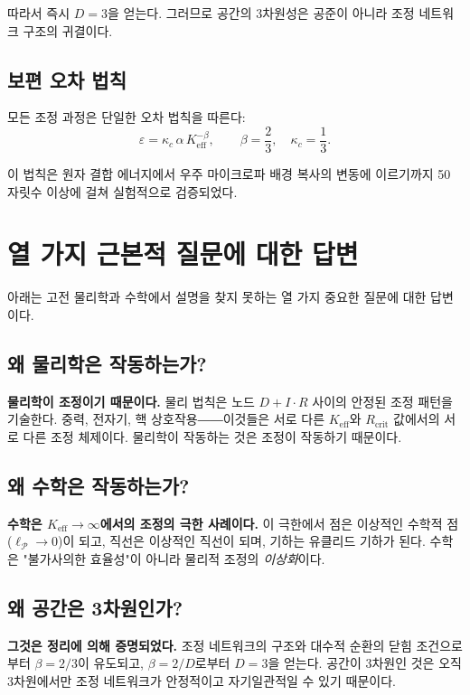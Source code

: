 \documentclass[12pt,a4paper]{article}
\newcommand{\Keff}{K_{\mathrm{eff}}}
\newcommand{\kappac}{\kappa_c}
\newcommand{\eps}{\varepsilon}
\newcommand{\betaf}{\beta}
\newcommand{\Rcrit}{R_{\mathrm{crit}}}
\newcommand{\calP}{\mathcal{P}}
\begin{document}
	따라서 즉시 \(D = 3\)을 얻는다. 그러므로 공간의 3차원성은 공준이 아니라 조정 네트워크 구조의 귀결이다.
	
	\subsection{보편 오차 법칙}
	
	모든 조정 과정은 단일한 오차 법칙을 따른다:
	\[
	\eps = \kappac\,\alpha\,\Keff^{-\betaf}, \qquad \betaf = \frac{2}{3}, \quad \kappac = \frac{1}{3}.
	\]
	
	이 법칙은 원자 결합 에너지에서 우주 마이크로파 배경 복사의 변동에 이르기까지 50 자릿수 이상에 걸쳐 실험적으로 검증되었다.
	
	\section{열 가지 근본적 질문에 대한 답변}
	
	아래는 고전 물리학과 수학에서 설명을 찾지 못하는 열 가지 중요한 질문에 대한 답변이다.
	
	\subsection{왜 물리학은 작동하는가?}
	
	\textbf{물리학이 조정이기 때문이다.} 물리 법칙은 노드 \(D+I\cdot R\) 사이의 안정된 조정 패턴을 기술한다. 중력, 전자기, 핵 상호작용――이것들은 서로 다른 \(\Keff\)와 \(\Rcrit\) 값에서의 서로 다른 조정 체제이다. 물리학이 작동하는 것은 조정이 작동하기 때문이다.
	
	\subsection{왜 수학은 작동하는가?}
	
	\textbf{수학은 \(\Keff \to \infty\)에서의 조정의 극한 사례이다.} 이 극한에서 점은 이상적인 수학적 점(\(\ell_{\calP} \to 0\))이 되고, 직선은 이상적인 직선이 되며, 기하는 유클리드 기하가 된다. 수학은 "불가사의한 효율성"이 아니라 물리적 조정의 \emph{이상화}이다.
	
	\subsection{왜 공간은 3차원인가?}
	
	\textbf{그것은 정리에 의해 증명되었다.} 조정 네트워크의 구조와 대수적 순환의 닫힘 조건으로부터 \(\betaf = 2/3\)이 유도되고, \(\betaf = 2/D\)로부터 \(D=3\)을 얻는다. 공간이 3차원인 것은 오직 3차원에서만 조정 네트워크가 안정적이고 자기일관적일 수 있기 때문이다.
	
\end{document}
